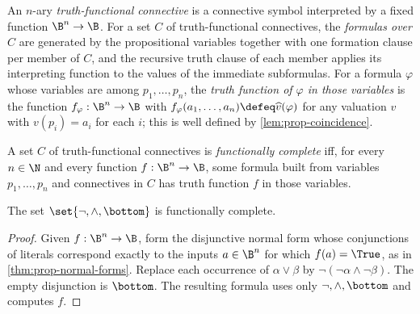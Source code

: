 An \(n\)-ary \emph{truth-functional connective} is a connective symbol
interpreted by a fixed function \(\B^n\to\B\).  For a set \(C\) of
truth-functional connectives, the \emph{formulas over \(C\)} are generated
by the propositional variables together with one formation clause per member
of \(C\), and the recursive truth clause of each member applies its
interpreting function to the values of the immediate subformulas.  For a
formula \(\varphi\) whose variables are among \(p_1,\ldots,p_n\), the
\emph{truth function of \(\varphi\) in those variables} is the function
\(f_\varphi:\B^n\to\B\) with
\(f_\varphi(a_1,\ldots,a_n)\defeq\widehat v(\varphi)\) for any valuation
\(v\) with \(v(p_i)=a_i\) for each \(i\); this is well defined by
\cref{lem:prop-coincidence}.

\begin{definition}
A set \(C\) of truth-functional connectives is \emph{functionally complete}
iff, for every \(n\in\N\) and every function \(f:\B^n\to\B\), some formula
built from variables \(p_1,\ldots,p_n\) and connectives in \(C\) has truth
function \(f\) in those variables.
\end{definition}

\begin{theorem}
\label{thm:p02-w02-p02-045-functional-basis}
The set \(\set{\neg,\land,\bottom}\) is functionally complete.
\end{theorem}
\begin{proof}
Given \(f:\B^n\to\B\), form the disjunctive normal form whose conjunctions of
literals correspond exactly to the inputs \(a\in\B^n\) for which
\(f(a)=\True\), as in \cref{thm:prop-normal-forms}.  Replace each occurrence
of \(\alpha\lor\beta\) by
\(\neg(\neg\alpha\land\neg\beta)\).  The empty disjunction is \(\bottom\).
The resulting formula uses only \(\neg,\land,\bottom\) and computes \(f\).
\end{proof}
